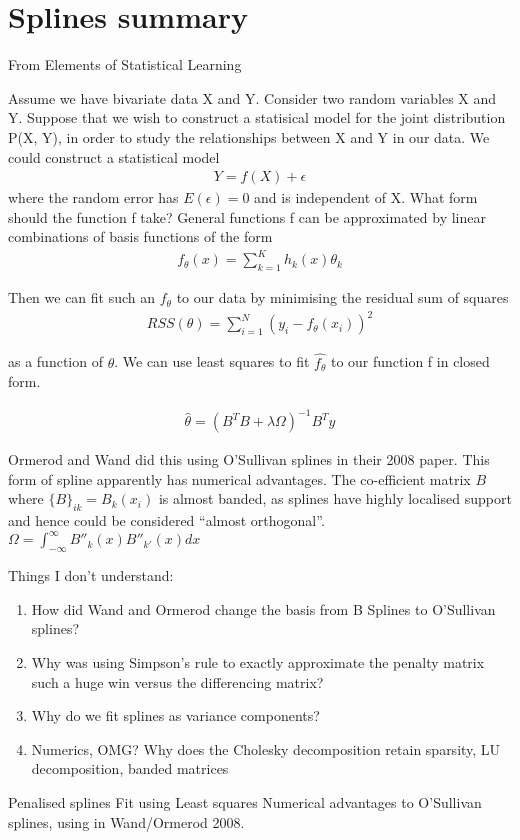 \documentclass{amsart}
\begin{document}
\section{Splines summary}
From Elements of Statistical Learning

Assume we have bivariate data X and Y. Consider two random variables X and Y.
Suppose that we wish to construct a statisical model for the joint distribution 
P(X, Y), in order to study the relationships between X and Y in our data. We
could construct a statistical model
\begin{align*}
	Y = f(X) + \epsilon	
\end{align*}
where the random error has $E(\epsilon) = 0$ and is independent of X. What form
should the function f take? General functions f can be approximated by linear
combinations of basis functions of the form
\begin{align*}
	f_\theta(x) = \sum_{k=1}^K h_k(x) \theta_k
\end{align*}

Then we can fit such an $f_\theta$ to our data by minimising the residual
sum of squares
\begin{align*}
	RSS(\theta) = \sum_{i=1}^N (y_i - f_\theta(x_i))^2
\end{align*}

as a function of $\theta$. We can use least squares %
to fit $\hat{f_{\theta}}$ to our function f in closed form.

\begin{align*}
	\hat{\theta} = (B^TB + \lambda \Omega)^{-1}B^T y
\end{align*}

Ormerod and Wand did this using O'Sullivan splines in their 2008 paper. This
form of spline apparently has numerical advantages. The co-efficient matrix
$B$ where $\{B\}_{ik} = B_{k}(x_i)$ is
almost banded, as splines have highly localised support and hence could be
considered ``almost orthogonal''.
$\Omega = \int_{-\infty}^{\infty} B''_{k}(x) B''_{k'}(x) dx$

Things I don't understand:
\begin{enumerate}
	\item How did Wand and Ormerod change the basis from B Splines to O'Sullivan
	splines?
	\item Why was using Simpson's rule to exactly approximate the penalty matrix
	such a huge win versus the differencing matrix?
	\item Why do we fit splines as variance components?
	\item Numerics, OMG? Why does the Cholesky decomposition retain sparsity,
	LU decomposition, banded matrices
\end{enumerate}

Penalised splines
Fit using Least squares
Numerical advantages to O'Sullivan splines, using in Wand/Ormerod 2008.
\end{document}
